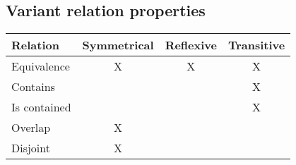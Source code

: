 \subsection*{Variant relation properties}
%
%
\begin{table}[h!]
    \begin{tabular}{|l|c|c|c|}
        \hline
        \textbf{Relation} & \textbf{Symmetrical} & \textbf{Reflexive} & \textbf{Transitive} \\
        \hline
        Equivalence       & X                    & X                  & X \\
        \hline 
        Contains          &                      &                    & X \\
        \hline 
        Is contained      &                      &                    & X \\
        \hline 
        Overlap           & X                    &                    &   \\
        \hline 
        Disjoint          & X                    &                    &   \\
        \hline
    \end{tabular}
\end{table}